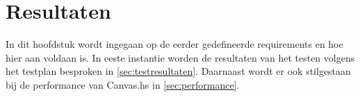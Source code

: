 \chapter{Resultaten} \label{hoofdstuk:resultaten}
In dit hoofdstuk wordt ingegaan op de eerder gedefineerde requirements en hoe hier aan voldaan is. In eeste instantie worden de resultaten van het testen volgens het testplan besproken in \autoref{sec:testresultaten}. Daarnaast wordt er ook stilgestaan bij de performance van Canvas.hs in \autoref{sec:performance}.

